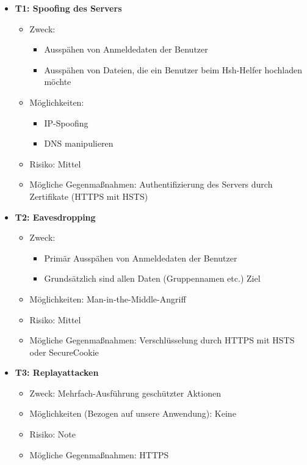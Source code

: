 \documentclass[12pt,DIV14,BCOR10mm,a4paper,parskip=half-,headsepline,headinclude,english,ngerman,bibliography=totocnumbered]{scrreprt}
\begin{document}
\begin{itemize}

  \hypertarget{threat1}{}
  \item \textbf{T1: Spoofing des Servers}
  \begin{itemize}
  \item Zweck:
  	\begin{itemize}
  		\item Ausspähen von Anmeldedaten der Benutzer
  		\item Ausspähen von Dateien, die ein Benutzer beim Hsh-Helfer hochladen möchte
  	\end{itemize}
  \item Möglichkeiten:
  	\begin{itemize}
  		\item IP-Spoofing
  		\item DNS manipulieren
  	\end{itemize}
  \item Risiko: Mittel
  \item Mögliche Gegenmaßnahmen: Authentifizierung des Servers durch Zertifikate (HTTPS mit HSTS)
  \end{itemize}

  \hypertarget{threat2}{}
  \item \textbf{T2: Eavesdropping}
  \begin{itemize}
  \item Zweck:
  	\begin{itemize}
  		\item Primär Ausspähen von Anmeldedaten der Benutzer
  		\item Grundsätzlich sind allen Daten (Gruppennamen etc.) Ziel
  	\end{itemize}
  \item Möglichkeiten: Man-in-the-Middle-Angriff
  \item Risiko: Mittel
  \item Mögliche Gegenmaßnahmen: Verschlüsselung durch HTTPS mit HSTS oder SecureCookie
  \end{itemize}

  \hypertarget{threat3}{}
  \item \textbf{T3: Replayattacken}
  \begin{itemize}
  \item Zweck: Mehrfach-Ausführung geschützter Aktionen
  \item Möglichkeiten (Bezogen auf unsere Anwendung): Keine
  \item Risiko: Note
  \item Mögliche Gegenmaßnahmen: HTTPS %
  \end{itemize}


\end{itemize}
\end{document}
